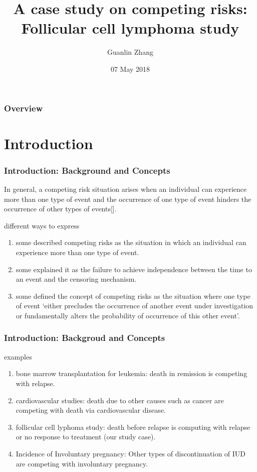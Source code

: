 \documentclass{beamer}[10]
\title{A case study on competing risks: Follicular cell lymphoma study}
\author{Guanlin Zhang}
\institute{Department of Biostatsitics \\ University of Kansas Medical Center}
\date{07 May 2018}
\begin{document}
\frame{\titlepage \vspace{-0.5cm}
}

\frame
{
\frametitle{Overview}
\tableofcontents%
}

\section{Introduction}

\begin{frame}
	\frametitle{Introduction: Background and Concepts}
	In general, a competing risk situation arises when an individual can experience more than one type of event and the occurrence of one type of event hinders the occurrence of other types of events[\cite{pintilie06}].
	\begin{block}{different ways to express}
		\begin{enumerate}
			\item some described competing risks as the situation in which an individual can experience more than one type of event.
			\item some explained it as the failure to achieve independence between the time to an event and the censoring mechanism.
			\item some defined the concept of competing risks as the situation where one type of event `either precludes the occurrence of another event under investigation or fundamentally alters the probability of occurrence of this other event'.
		\end{enumerate}
	\end{block}
\end{frame}
\begin{frame}
	\frametitle{Introduction: Backgroud and Concepts}
	\begin{block}{examples}
		\begin{enumerate}
			\item bone marrow transplantation for leukemia: death in remission is competing with relapse.
			\item cardiovascular studies: death due to other causes such as cancer are competing with death via cardiovascular disease.
			\item follicular cell lyphoma study: death before relapse is computing with relapse or no response to treatment (our study case).
			\item Incidence of Involuntary pregnancy: Other types of discontinuation of IUD are competing with involuntary pregnancy.
		\end{enumerate}
	\end{block}
\end{frame}
\end{document}
